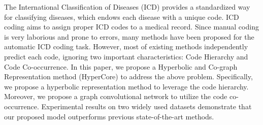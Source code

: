 The International Classification of Diseases (ICD) provides a standardized way for classifying diseases, which endows each disease with a unique code. ICD coding aims to assign proper ICD codes to a medical record. Since manual coding is very laborious and prone to errors, many methods have been proposed for the automatic ICD coding task. However, most of existing methods independently predict each code, ignoring two important characteristics: Code Hierarchy and Code Co-occurrence. In this paper, we propose a Hyperbolic and Co-graph Representation method (HyperCore) to address the above problem. Specifically, we propose a hyperbolic representation method to leverage the code hierarchy. Moreover, we propose a graph convolutional network to utilize the code co-occurrence. Experimental results on two widely used datasets demonstrate that our proposed model outperforms previous state-of-the-art methods.
